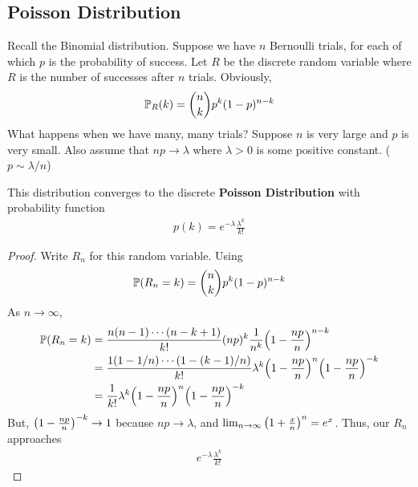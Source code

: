 \subsection{Poisson Distribution}
Recall the Binomial distribution. Suppose we have $n$ Bernoulli trials, for each of which $p$ is the probability of success. Let $R$ be the discrete random variable where $R$ is the number of successes after $n$ trials. Obviously,
\begin{align}
    \mathbb{P}_R(k) = \binom{n}{k} p^k (1-p)^{n-k}
\end{align}
What happens when we have many, many trials? Suppose $n$ is very large and $p$ is very small. Also assume that $np \to \lambda$ where $\lambda > 0$ is some positive constant. ($p \sim \lambda/n$)
\begin{proposition}
    This distribution converges to the discrete \textbf{Poisson Distribution} with probability function
    \begin{align}
        p(k) = e^{-\lambda} \frac{\lambda^k}{k!}
    \end{align}
\end{proposition}
\begin{proof}
    Write $R_n$ for this random variable. Using
    \begin{align}
        \mathbb{P}(R_n = k) = \binom{n}{k}p^k (1-p)^{n-k}
    \end{align}
    As $n \to \infty$,
    \begin{align}
        \mathbb{P}(R_n = k) &= \frac{n(n-1)\cdots(n-k+1)}{k!} (np)^k \frac{1}{n^k} \qty(1 - \frac{np}{n})^{n-k}\\
        &= \frac{1(1-1/n)\cdots(1-(k-1)/n)}{k!} \lambda^k \qty(1 - \frac{np}{n})^n \qty(1 - \frac{np}{n})^{-k}\\
        &= \frac{1}{k!} \lambda^k \qty(1 - \frac{np}{n})^n \qty(1 - \frac{np}{n})^{-k}
    \end{align}
    But, $\qty(1 - \frac{np}{n})^{-k} \to 1$ because $np \to \lambda$, and $\lim_{n\to\infty}\qty(1 + \frac{x}{n})^n = e^x$. Thus, our $R_n$ approaches
    \begin{align}
        e^{-\lambda} \frac{\lambda^k}{k!}
    \end{align}
\end{proof}

